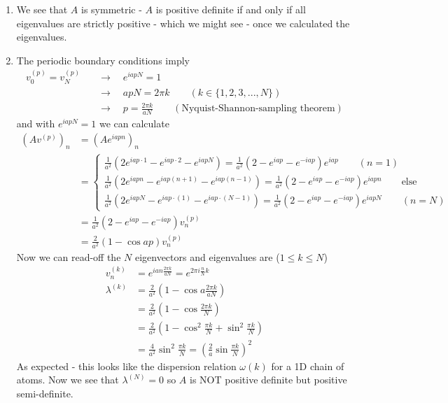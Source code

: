 \documentclass[10pt,a4paper]{article}
\theoremstyle{definition}
\begin{document}
\begin{enumerate}[1.]
\item We see that $A$ is symmetric -  $A$ is positive definite if and only if all eigenvalues are strictly positive - which we might see - once we calculated the eigenvalues.

\item The periodic boundary conditions imply
\begin{align}
v^{(p)}_0=v^{(p)}_N
&\quad\rightarrow\quad e^{iapN}=1\\
&\quad\rightarrow\quad apN=2\pi k\qquad(k\in\{1,2,3,...,N\})\\
&\quad\rightarrow\quad p=\frac{2\pi k}{aN}\qquad(\text{Nyquist-Shannon-sampling theorem})
\end{align}
and with $e^{iapN}=1$ we can calculate
\begin{align}
(Av^{(p)})_n
&=(Ae^{iapn})_n\\
&=\begin{cases}
\frac{1}{a^2}(2e^{iap\cdot1}-e^{iap\cdot2}-e^{iapN})=\frac{1}{a^2}(2-e^{iap}-e^{-iap})e^{iap}\qquad(n=1)\\
\frac{1}{a^2}(2e^{iapn}-e^{iap(n+1)}-e^{iap(n-1)})=\frac{1}{a^2}(2-e^{iap}-e^{-iap})e^{iapn}\qquad\text{else}\\
\frac{1}{a^2}(2e^{iapN}-e^{iap\cdot(1)}-e^{iap\cdot(N-1)})=\frac{1}{a^2}(2-e^{iap}-e^{-iap})e^{iapN}\qquad(n=N)
\end{cases}\\
&=\frac{1}{a^2}(2-e^{iap}-e^{-iap})v^{(p)}_n\\
&=\frac{2}{a^2}(1-\cos ap)v^{(p)}_n
\end{align}
Now we can read-off the $N$ eigenvectors and eigenvalues are ($1\le k\le N$)
\begin{align}
v^{(k)}_n
&=e^{ian\frac{2\pi k}{aN}}
=e^{2\pi i\frac{n}{N}k}\\
\lambda^{(k)}
&=\frac{2}{a^2}\left(1-\cos a\frac{2\pi k}{aN}\right)\\
&=\frac{2}{a^2}\left(1-\cos \frac{2\pi k}{N}\right)\\
&=\frac{2}{a^2}\left(1-\cos^2 \frac{\pi k}{N}+\sin^2 \frac{\pi k}{N}\right)\\
&=\frac{4}{a^2}\sin^2 \frac{\pi k}{N}=\left(\frac{2}{a}\sin\frac{\pi k}{N}\right)^2
\end{align}
As expected - this looks like the dispersion relation $\omega(k)$ for a 1D chain of atoms.
Now we see that $\lambda^{(N)}=0$ so $A$ is NOT positive definite but positive semi-definite.


\end{enumerate}
\end{document}
